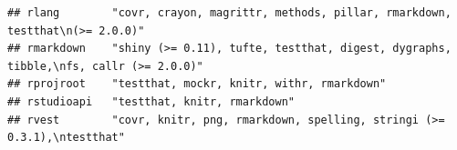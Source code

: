 \documentclass[]{article}
\begin{document}
\begin{verbatim}
## rlang        "covr, crayon, magrittr, methods, pillar, rmarkdown, testthat\n(>= 2.0.0)"                                                                                                                                                                                                                                                                                                                                                                                                                                                                                                                
## rmarkdown    "shiny (>= 0.11), tufte, testthat, digest, dygraphs, tibble,\nfs, callr (>= 2.0.0)"                                                                                                                                                                                                                                                                                                                                                                                                                                                                                                       
## rprojroot    "testthat, mockr, knitr, withr, rmarkdown"                                                                                                                                                                                                                                                                                                                                                                                                                                                                                                                                                
## rstudioapi   "testthat, knitr, rmarkdown"                                                                                                                                                                                                                                                                                                                                                                                                                                                                                                                                                              
## rvest        "covr, knitr, png, rmarkdown, spelling, stringi (>= 0.3.1),\ntestthat"                                                                                                                                                                                                                                                                                                                                                                                                                                                                                                                    

\end{verbatim}
\end{document}
